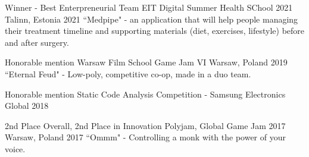
\begin{cvhonors}

  \cvhonor
    {Winner - Best Enterpreneurial Team} %
    {EIT Digital Summer Health SChool 2021} %
    {Talinn, Estonia} %
    {2021} %
  \cvhonordet %
    {}
    {``Medpipe" - an application that will help people managing their treatment timeline and supporting materials (diet, exercises, lifestyle) before and after surgery. } %
    {}
    {}

  \cvhonor
    {Honorable mention} %
    {Warsaw Film School Game Jam VI} %
    {Warsaw, Poland} %
    {2019} %
  \cvhonordet %
    {}
    {``Eternal Feud" - Low-poly, competitive co-op, made in a duo team. } %
    {}
    {}

  \cvhonor
    {Honorable mention} %
    {Static Code Analysis Competition - Samsung Electronics} %
    {Global} %
    {2018} %

  \cvhonor
    {2nd Place Overall, 2nd Place in Innovation} %
    {Polyjam, Global Game Jam 2017} %
    {Warsaw, Poland} %
    {2017} %
  \cvhonordet %
    {}
    {``Ommm" - Controlling a monk with the power of your voice. } %
    {}
    {}

\end{cvhonors}
